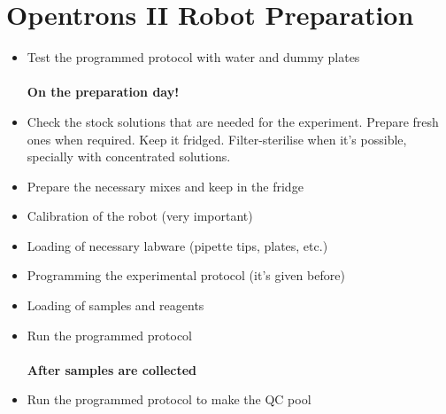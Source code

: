 \documentclass{article}
\newcommand{\bigbox}{\raisebox{\depth}{\scalebox{1.5}{$\square$}}}
\begin{document}
\section{Opentrons II Robot Preparation}
\begin{itemize}
\item[\bigbox] {Test the programmed protocol with water and dummy plates}
\\\\
\textbf{On the preparation day!}

\item[\bigbox] {Check the stock solutions that are needed for the experiment. Prepare fresh ones when required. Keep it fridged. Filter-sterilise when it's possible, specially with concentrated solutions.}
\item[\bigbox] {Prepare the necessary mixes and keep in the fridge}
\item[\bigbox] {Calibration of the robot (very important)}
\item[\bigbox] {Loading of necessary labware (pipette tips, plates, etc.)}
\item[\bigbox] {Programming the experimental protocol (it's given before)}
\item[\bigbox] {Loading of samples and reagents}
\item[\bigbox] {Run the programmed protocol}
\\\\
\textbf{After samples are collected} 

\item[\bigbox] {Run the programmed protocol to make the QC pool}

\end{itemize}
\end{document}
